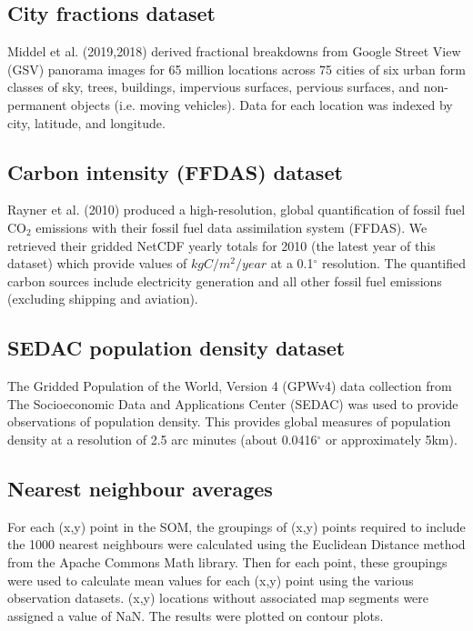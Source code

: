 \documentclass[9pt,twocolumn,twoside,lineno]{pnas-new}
\begin{document}
{\subsection*{City fractions dataset}\label{gsvdata}
Middel et al. (2019,2018)\cite{Middel2019,Middel2018} derived fractional breakdowns from Google Street View (GSV) panorama images for 65 million locations across 75 cities of six urban form classes of sky, trees, buildings, impervious surfaces, pervious surfaces, and non-permanent objects (i.e. moving vehicles). Data for each location was indexed by city, latitude, and longitude. 

\subsection*{Carbon intensity (FFDAS) dataset}\label{ffdasdata}
Rayner et al. (2010)\cite{Rayner2010a,Asefi-Najafabad2014} produced a high-resolution, global quantification of fossil fuel CO$_{2}$ emissions with their fossil fuel data assimilation system (FFDAS). We retrieved their gridded NetCDF yearly totals for 2010 (the latest year of this dataset) which provide values of $kgC/m^{2}/year$ at a 0.1$^\circ$ resolution. The quantified carbon sources include electricity generation and all other fossil fuel emissions (excluding shipping and aviation).

\subsection*{SEDAC population density dataset}\label{populationdata}
The Gridded Population of the World, Version 4 (GPWv4) data collection\cite{CIESIN2018} from The Socioeconomic Data and Applications Center (SEDAC) was used to provide observations of population density. This provides global measures of population density at a resolution of 2.5 arc minutes (about 0.0416$^\circ$ or approximately 5km).

\subsection*{Nearest neighbour averages}\label{knndata}
For each (x,y) point in the SOM, the groupings of (x,y) points required to include the 1000 nearest neighbours were calculated using the Euclidean Distance method from the Apache Commons Math library\cite{ApacheCommons2019}. Then for each point, these groupings were used to calculate mean values for each (x,y) point using the various observation datasets. (x,y) locations without associated map segments were assigned a value of NaN. The results were plotted on contour plots.

}
\end{document}
